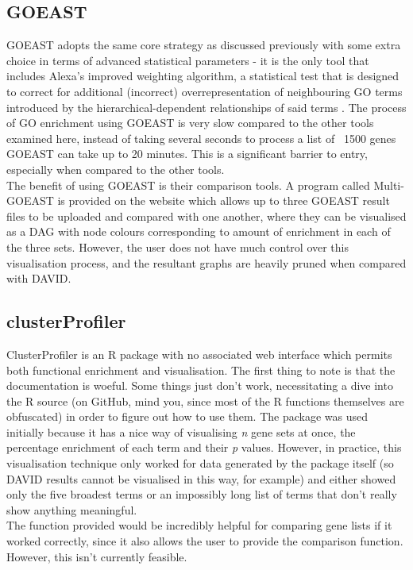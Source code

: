 \documentclass[11pt, oneside]{article}
\begin{document}
\subsection*{GOEAST}
GOEAST adopts the same core strategy as discussed previously with some extra choice in terms of advanced statistical parameters - it is the only tool that includes Alexa's improved weighting algorithm, a statistical test that is designed to correct for additional (incorrect) overrepresentation of neighbouring GO terms introduced by the hierarchical-dependent relationships of said terms \cite{GOEast08}. The process of GO enrichment using GOEAST is very slow compared to the other tools examined here, instead of taking several seconds to process a list of ~1500 genes GOEAST can take up to 20 minutes. This is a significant barrier to entry, especially when compared to the other tools.\\
The benefit of using GOEAST is their comparison tools. A program called Multi-GOEAST is provided on the website which allows up to three GOEAST result files to be uploaded and compared with one another, where they can be visualised as a DAG with node colours corresponding to amount of enrichment in each of the three sets. However, the user does not have much control over this visualisation process, and the resultant graphs are heavily pruned when compared with DAVID.
\subsection*{clusterProfiler}
ClusterProfiler is an R package with no associated web interface which permits both functional enrichment and visualisation. The first thing to note is that the documentation is woeful. Some things just don't work, necessitating a dive into the R source (on GitHub, mind you, since most of the R functions themselves are obfuscated) in order to figure out how to use them. The package was used initially because it has a nice way of visualising \emph{n} gene sets at once, the percentage enrichment of each term and their \emph{p} values. However, in practice, this visualisation technique only worked for data generated by the package itself (so DAVID results cannot be visualised in this way, for example) and either showed only the five broadest terms or an impossibly long list of terms that don't really show anything meaningful.\\
The function provided would be incredibly helpful for comparing gene lists if it worked correctly, since it also allows the user to provide the comparison function. However, this isn't currently feasible.
\end{document}
